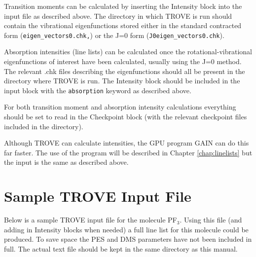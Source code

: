 Transition moments can be calculated by inserting the Intensity block into the input file as described above. 
The directory in which TROVE is run should contain the vibrational
eigenfunctions stored either in the standard contracted form 
(\verb|eigen_vectors0.chk,|) or the J=0 form (\verb|J0eigen_vectors0.chk|). 

Absorption intensities (line lists) can be calculated once the rotational-vibrational 
eigenfunctions of interest have been calculated, usually using the J=0 method. 
The relevant .chk files describing the eigenfunctions should all be present in the directory where TROVE is run. 
The Intensity block should be included in the input block with the \verb|absorption| keyword as described above.

For both transition moment and absorption intensity calculations everything should be set to read in the Checkpoint block 
(with the relevant checkpoint files included in the directory). 

Although TROVE can calculate intensities, the GPU program GAIN can do this far faster.\cite{jt653} 
The use of the program will be described in Chapter \ref{chap:linelists} but the input is the same as described above. 


\section{Sample TROVE Input File}

Below is a sample TROVE input file for the molecule PF$_3$. Using this file (and adding in Intensity blocks when needed)
a full line list for this molecule could be produced. To save space the PES and DMS parameters have not been included
in full. The actual text file should be kept in the same directory as this manual.

